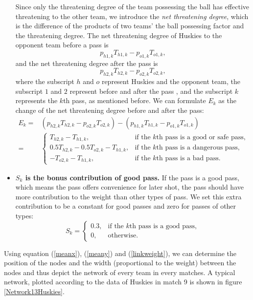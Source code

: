 \documentclass[12pt]{article}
\begin{document}
\begin{itemize}
\begin{itemize}
		\end{itemize}
		Since only the threatening degree of the team possessing the ball has effective threatening to the other team, we introduce the \textit{net threatening degree}, which is the difference of the products of two teams' the ball possessing factor and the threatening degree. The net threatening degree of Huskies to the opponent team before a pass is
		\[
			p_{h1,k}T_{h1,k}-p_{o1,k}T_{o1,k},
		\]
		and the net threatening degree after the pass is
		\[
			p_{h2,k}T_{h2,k}-p_{o2,k}T_{o2,k},
		\]
		where the subscript $h$ and $o$ represent Huskies and the opponent team, the subscript $1$ and $2$ represent before and after the pass , and the subscript $k$ represents the $k$th pass, as mentioned before. We can formulate $E_k$ as the change of the net threatening degree before and after the pass:
		\begin{align}
			\nonumber E_k=&(p_{h2,k}T_{h2,k}-p_{o2,k}T_{o2,k})-(p_{h1,k}T_{h1,k}-p_{o1,k}T_{o1,k})\\
			=&\left\{\begin{array}{ll}
					T_{h2,k}-T_{h1,k},&\text{if the $k$th pass is a good or safe pass,}\\
					0.5T_{h2,k}-0.5T_{o2,k}-T_{h1,k},&\text{if the $k$th pass is a dangerous pass,}\\
					-T_{o2,k}-T_{h1,k},&\text{if the $k$th pass is a bad pass.}
				\end{array}\right.
		\end{align}
		\item \textbf{$S_k$ is the bonus contribution of good pass.} If the pass is a good pass, which means the pass offers convenience for later shot, the pass should have more contribution to the weight than other types of pass. We set this extra contribution to be a constant for good passes and zero for passes of other types:
		\begin{equation}
			S_k=\left\{\begin{array}{ll}
				0.3,&\text{if the $k$th pass is a good pass},\\
				0,&\text{otherwise.}
			\end{array}\right.
		\end{equation}
	\end{itemize}
Using equation (\ref{meanx}), (\ref{meany}) and (\ref{linkweight}), we can determine the position of the nodes and the width (proportional to the weight) between the nodes and thus depict the network of every team in every matches. A typical network, plotted according to the data of Huskies in match 9 is shown in figure \ref{Network13Huskies}.
\end{document}
